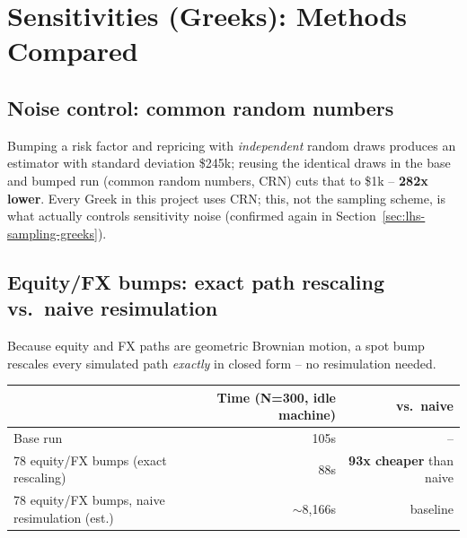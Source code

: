 \documentclass[10pt,letterpaper]{article}
\begin{document}
\section{Sensitivities (Greeks): Methods Compared}

\subsection{Noise control: common random numbers}
Bumping a risk factor and repricing with \emph{independent} random draws produces an estimator with standard deviation \$245k; reusing the identical draws in the base and bumped run (common random numbers, CRN) cuts that to \$1k -- \textbf{282x lower}. Every Greek in this project uses CRN; this, not the sampling scheme, is what actually controls sensitivity noise (confirmed again in Section~\ref{sec:lhs-sampling-greeks}).

\subsection{Equity/FX bumps: exact path rescaling vs.\ naive resimulation}
Because equity and FX paths are geometric Brownian motion, a spot bump rescales every simulated path \emph{exactly} in closed form -- no resimulation needed.
\begin{center}\small
\begin{tabular}{lrr}
\toprule
& \textbf{Time (N=300, idle machine)} & \textbf{vs.\ naive} \\
\midrule
Base run & 105s & -- \\
78 equity/FX bumps (exact rescaling) & 88s & \textbf{93x cheaper} than naive \\
78 equity/FX bumps, naive resimulation (est.) & $\sim$8,166s & baseline \\
\bottomrule
\end{tabular}
\end{center}
\end{document}
